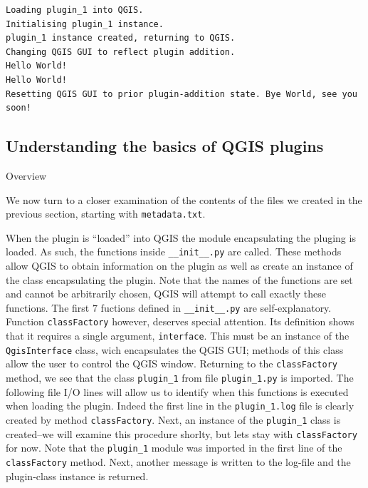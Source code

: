 \begin{lstlisting}
Loading plugin_1 into QGIS.
Initialising plugin_1 instance.
plugin_1 instance created, returning to QGIS.
Changing QGIS GUI to reflect plugin addition.
Hello World!
Hello World!
Resetting QGIS GUI to prior plugin-addition state. Bye World, see you soon!
\end{lstlisting}

\subsection{Understanding the basics of QGIS plugins}
\label{ssect:understanding_plugin_basics}
\par%
Overview
\par%
We now turn to a closer examination of the contents of the files we created in the previous section, starting with \lstinline{metadata.txt}. 
\par%
When the plugin is ``loaded'' into QGIS the module encapsulating the pluging is loaded. As such, the functions inside \lstinline{__init__.py} are called. These methods allow QGIS to obtain information on the plugin as well as create an instance of the class encapsulating the plugin. Note that the names of the functions are set and cannot be arbitrarily chosen, QGIS will attempt to call exactly these functions. The first $7$ fuctions defined in \lstinline{__init__.py} are self-explanatory. Function \lstinline{classFactory} however, deserves special attention. Its definition shows that it requires a single argument, \lstinline{interface}. This must be an instance of the \lstinline{QgisInterface} class, wich encapsulates the QGIS GUI; methods of this class allow the user to control the QGIS window. Returning to the \lstinline{classFactory} method, we see that the class \lstinline{plugin_1} from file \lstinline{plugin_1.py} is imported. The following file I/O lines will allow us to identify when this functions is executed when loading the plugin. Indeed the first line in the \lstinline{plugin_1.log} file is clearly created by method \lstinline{classFactory}. Next, an instance of the \lstinline{plugin_1} class is created--we will examine this procedure shorlty, but lets stay with \lstinline{classFactory} for now. Note that the \lstinline{plugin_1} module was imported in the first line of the \lstinline{classFactory} method. Next, another message is written to the log-file and the plugin-class instance is returned.
\par%
